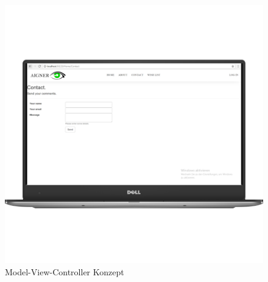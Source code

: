 \begin{figure}[H]
\begin{center}
	\includegraphics[scale=.2]{images/Contact.png}
\end{center}
	\caption{Model-View-Controller Konzept}
	\label{fig:sample}
\end{figure}




